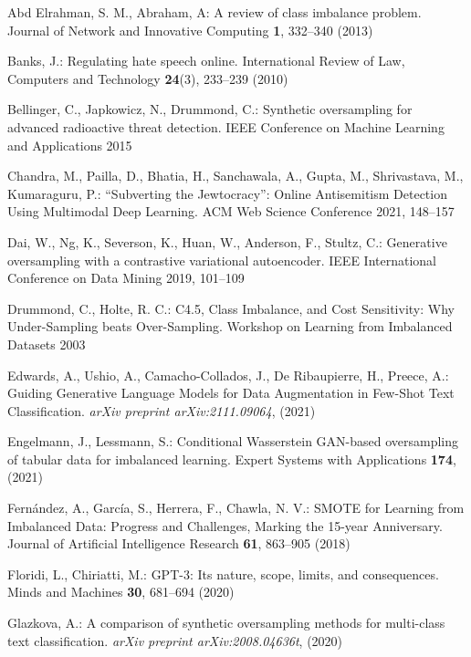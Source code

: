 \documentclass[runningheads]{llncs}
\begin{document}
\begin{thebibliography}{33}
Abd Elrahman, S. M., Abraham, A: A review of class imbalance problem. Journal of Network and Innovative Computing \textbf{1}, 332--340 (2013)

Banks, J.: Regulating hate speech online. International Review of Law, Computers and Technology \textbf{24}(3), 233--239 (2010)

Bellinger, C., Japkowicz, N., Drummond, C.: Synthetic oversampling for advanced radioactive threat detection. IEEE Conference on Machine Learning and Applications 2015

Chandra, M., Pailla, D., Bhatia, H., Sanchawala, A., Gupta, M., Shrivastava, M., Kumaraguru, P.: ``Subverting the Jewtocracy'': Online Antisemitism Detection Using Multimodal Deep Learning. ACM Web Science Conference 2021, 148--157

Dai, W., Ng, K., Severson, K., Huan, W., Anderson, F., Stultz, C.: Generative oversampling with a contrastive variational autoencoder. IEEE International Conference on Data Mining 2019, 101--109

Drummond, C., Holte, R. C.: C4.5, Class Imbalance, and Cost Sensitivity: Why Under-Sampling beats Over-Sampling. Workshop on Learning from Imbalanced Datasets 2003

Edwards, A., Ushio, A., Camacho-Collados, J., De Ribaupierre, H., Preece, A.: Guiding Generative Language Models for Data Augmentation in Few-Shot Text Classification. \emph{arXiv preprint arXiv:2111.09064}, (2021)

Engelmann, J., Lessmann, S.: Conditional Wasserstein GAN-based oversampling of tabular data for imbalanced learning. Expert Systems with Applications \textbf{174}, (2021)

Fernández, A., García, S., Herrera, F., Chawla, N. V.: SMOTE for Learning from Imbalanced Data: Progress and Challenges, Marking the 15-year Anniversary. Journal of Artificial Intelligence Research \textbf{61}, 863--905 (2018)

Floridi, L., Chiriatti, M.: GPT-3: Its nature, scope, limits, and consequences. Minds and Machines \textbf{30}, 681--694 (2020)

Glazkova, A.: A comparison of synthetic oversampling methods for multi-class text classification. \emph{arXiv preprint arXiv:2008.04636t}, (2020)


\end{thebibliography}
\end{document}
